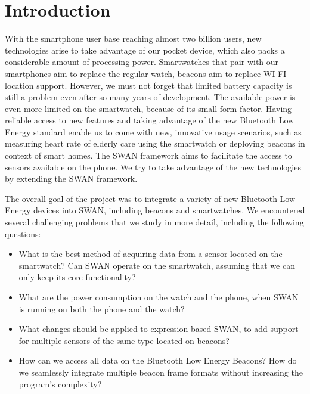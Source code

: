 
\chapter{Introduction} %

\label{Chapter1} %


With the smartphone user base reaching almost two billion users, new technologies arise to take advantage of our pocket device, which also packs a considerable amount of processing power.
Smartwatches that pair with our smartphones aim to replace the regular watch, beacons aim to replace WI-FI location support. 
However, we must not forget that limited battery capacity is still a problem even after so many years of development. The available power is even more limited on the smartwatch, because of
its small form factor.
Having reliable access to new features and taking advantage of the new Bluetooth Low Energy\cite{bt_low} standard
enable us to come with new, innovative usage scenarios, such as measuring heart rate of elderly care using the smartwatch or deploying beacons in context of smart homes.
The SWAN framework aims to facilitate the access to sensors available on the phone.
We try to take advantage of the new technologies by extending the SWAN framework.

The overall goal of the project was to integrate a variety of new Bluetooth Low Energy devices into SWAN,
including beacons and smartwatches. We encountered several challenging problems that we study in more detail,
including the following questions:

\begin{itemize}
 \item What is the best method of acquiring data from a sensor located on the smartwatch? Can SWAN operate on the smartwatch, assuming that we can only keep its core functionality?
 \item What are the power consumption on the watch and  the  phone, when SWAN is running on both the phone and the watch?
 \item What changes should be applied to expression based SWAN, to add support for multiple sensors of the same type located on beacons?
 \item How can we access all data on the Bluetooth Low Energy Beacons? How do we seamlessly integrate multiple beacon frame formats without increasing the program's complexity?
\end{itemize}

